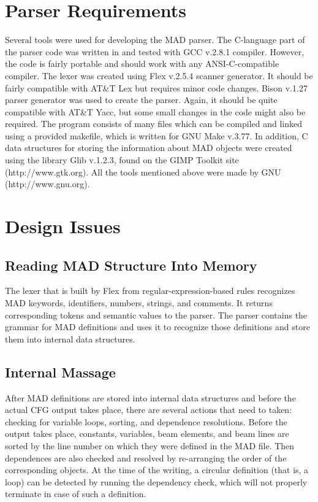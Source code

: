 \documentclass[12pt]{article}
\begin{document}
\section{Parser Requirements}
Several tools were used for developing the MAD parser. The C-language part
of the parser code was written in and tested with GCC v.2.8.1 compiler.
However, the code is fairly portable and should work with any
ANSI-C-compatible compiler. The lexer was created using Flex v.2.5.4
scanner generator. It should be fairly compatible with AT\&T Lex but
requires minor code changes. Bison v.1.27 parser generator was used to
create the parser. Again, it should be quite compatible with AT\&T Yacc,
but some small changes in the code might also be required. The program
consists of many files which can be compiled and linked using a provided
makefile, which is written for GNU Make v.3.77. In addition, C data structures
for storing the information about MAD objects were created using the library
Glib v.1.2.3, found on the GIMP Toolkit site (http://www.gtk.org). All the
tools mentioned above were made by GNU (http://www.gnu.org).

\section{Design Issues}
\subsection{Reading MAD Structure Into Memory}
The lexer that is built by Flex from regular-expression-based rules
recognizes MAD keywords, identifiers, numbers, strings, and comments. It
returns corresponding tokens and semantic values to the parser. The parser
contains the grammar for MAD definitions and uses it to recognize those
definitions and store them into internal data structures.

\subsection{Internal Massage}
After MAD definitions are stored into internal data structures and before
the actual CFG output takes place, there are several actions that need to
taken: checking for variable loops, sorting, and dependence resolutions.
Before the output takes place, constants, variables, beam elements, and beam
lines are sorted by the line number on which they were defined in the MAD file.
Then dependences are also checked and resolved by re-arranging the order
of the corresponding objects. At the time of the writing, a circular
definition (that is, a loop) can be detected by running the dependency
check, which will not properly terminate in case of such a definition.
\end{document}
